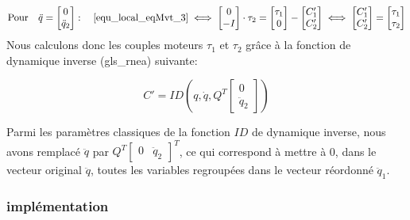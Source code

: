 \documentclass{report}
\begin{document}
\begin{equation}
\textnormal{Pour} \quad \ddot{q}=
\begin{bmatrix}
  0 \\
  \ddot{q}_2
\end{bmatrix}
: \quad
\eqref{equ_local_eqMvt_3} \iff
\begin{bmatrix}
  0 \\
  -I
\end{bmatrix} 
\cdot \tau_2
=
\begin{bmatrix}
  \tau_1 \\
  0
\end{bmatrix} 
-
\begin{bmatrix}
  C'_1 \\
  C'_2
\end{bmatrix}
\iff
\begin{bmatrix}
  C'_1 \\
  C'_2
\end{bmatrix}
=
\begin{bmatrix}
  \tau_1 \\
  \tau_2
\end{bmatrix} 
\end{equation}
\medskip
Nous calculons donc les couples moteurs $\tau_1$ et $\tau_2$ grâce à la fonction de dynamique inverse (\gls{gls_rnea}) suivante:

\begin{equation}
C'=ID \left( q,\dot{q},Q^T
\begin{bmatrix}
  0 \\
  \ddot{q}_2
\end{bmatrix} \right)
\end{equation}

Parmi les paramètres classiques de la fonction $ID$ de dynamique inverse, nous avons remplacé $\ddot{q}$ par 
\(Q^T \begin{bmatrix} 0 & \ddot{q}_2 \end{bmatrix}^T\), 
ce qui correspond à mettre à 0, dans le vecteur original $\ddot{q}$, toutes les variables regroupées dans le vecteur réordonné $\ddot{q}_1$.

\subsubsection{implémentation}
\end{document}
